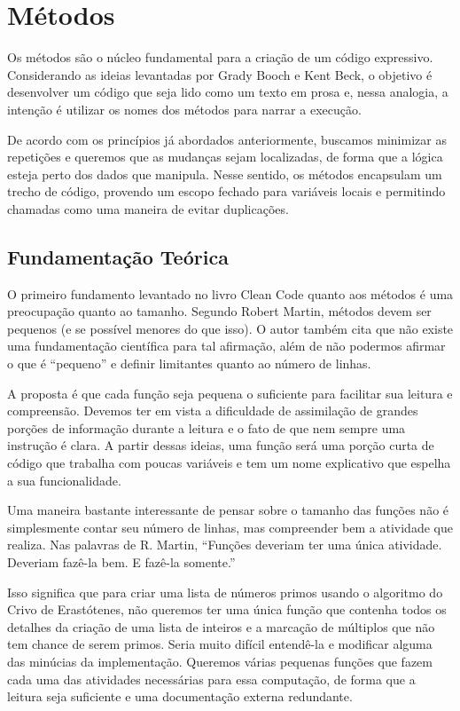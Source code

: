 \section{Métodos}
\label{sec:metodos}

	Os métodos são o núcleo fundamental para a criação de um código expressivo. Considerando as ideias levantadas por Grady Booch e Kent Beck, o objetivo é desenvolver um código que seja lido como um texto em prosa e, nessa analogia, a intenção é utilizar os nomes dos métodos para narrar a execução.
	
	De acordo com os princípios já abordados anteriormente, buscamos minimizar as repetições e queremos que as mudanças sejam localizadas, de forma que a lógica esteja perto dos dados que manipula. Nesse sentido, os métodos encapsulam um trecho de código, provendo um escopo fechado para variáveis locais e permitindo chamadas como uma maneira de evitar duplicações.

\subsection{Fundamentação Teórica}
	O primeiro fundamento levantado no livro Clean Code quanto aos métodos é uma preocupação quanto ao tamanho. Segundo Robert Martin, métodos devem ser pequenos (e se possível menores do que isso). O autor também cita que não existe uma fundamentação científica para tal afirmação, além de não podermos afirmar o que é “pequeno” e definir limitantes quanto ao número de linhas.
	
	A proposta é que cada função seja pequena o suficiente para facilitar sua leitura e compreensão. Devemos ter em vista a dificuldade de assimilação de grandes porções de informação durante a leitura e o fato de que nem sempre uma instrução é clara. A partir dessas ideias, uma função será uma porção curta de código que trabalha com poucas variáveis e tem um nome explicativo que espelha a sua funcionalidade.
	
	Uma maneira bastante interessante de pensar sobre o tamanho das funções não é simplesmente contar seu número de linhas, mas compreender bem a atividade que realiza. Nas palavras de R. Martin, “Funções deveriam ter uma única atividade. Deveriam fazê-la bem. E fazê-la somente.”
	
	Isso significa que para criar uma lista de números primos usando o algoritmo do Crivo de Erastótenes, não queremos ter uma única função que contenha todos os detalhes da criação de uma lista de inteiros e a marcação de múltiplos que não tem chance de serem primos. Seria muito difícil entendê-la e modificar alguma das minúcias da implementação. Queremos várias pequenas funções que fazem cada uma das atividades necessárias para essa computação, de forma que a leitura seja suficiente e uma documentação externa redundante.
	
